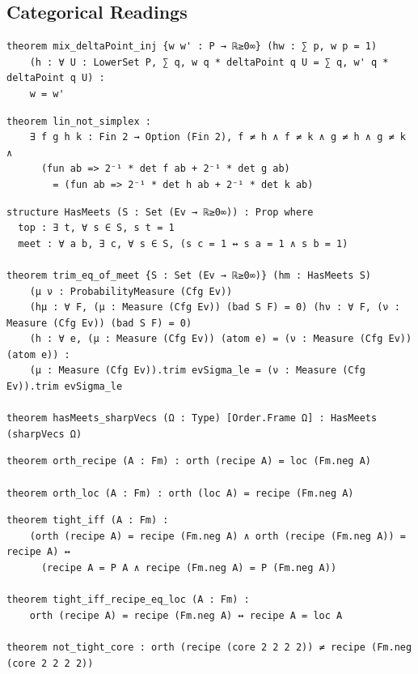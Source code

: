 \subsection{Categorical Readings}

\label{lean:mix-deltapoint-inj}
\begin{lstlisting}
theorem mix_deltaPoint_inj {w w' : P → ℝ≥0∞} (hw : ∑ p, w p = 1)
    (h : ∀ U : LowerSet P, ∑ q, w q * deltaPoint q U = ∑ q, w' q * deltaPoint q U) :
    w = w'
\end{lstlisting}

\label{lean:lin-not-simplex}
\begin{lstlisting}
theorem lin_not_simplex :
    ∃ f g h k : Fin 2 → Option (Fin 2), f ≠ h ∧ f ≠ k ∧ g ≠ h ∧ g ≠ k ∧
      (fun ab => 2⁻¹ * det f ab + 2⁻¹ * det g ab)
        = (fun ab => 2⁻¹ * det h ab + 2⁻¹ * det k ab)
\end{lstlisting}

\label{lean:rep-unique}
\begin{lstlisting}
structure HasMeets (S : Set (Ev → ℝ≥0∞)) : Prop where
  top : ∃ t, ∀ s ∈ S, s t = 1
  meet : ∀ a b, ∃ c, ∀ s ∈ S, (s c = 1 ↔ s a = 1 ∧ s b = 1)

theorem trim_eq_of_meet {S : Set (Ev → ℝ≥0∞)} (hm : HasMeets S)
    (μ ν : ProbabilityMeasure (Cfg Ev))
    (hμ : ∀ F, (μ : Measure (Cfg Ev)) (bad S F) = 0) (hν : ∀ F, (ν : Measure (Cfg Ev)) (bad S F) = 0)
    (h : ∀ e, (μ : Measure (Cfg Ev)) (atom e) = (ν : Measure (Cfg Ev)) (atom e)) :
    (μ : Measure (Cfg Ev)).trim evSigma_le = (ν : Measure (Cfg Ev)).trim evSigma_le

theorem hasMeets_sharpVecs (Ω : Type) [Order.Frame Ω] : HasMeets (sharpVecs Ω)
\end{lstlisting}

\label{lean:orth-recipe}
\begin{lstlisting}
theorem orth_recipe (A : Fm) : orth (recipe A) = loc (Fm.neg A)

theorem orth_loc (A : Fm) : orth (loc A) = recipe (Fm.neg A)
\end{lstlisting}

\label{lean:tight}
\begin{lstlisting}
theorem tight_iff (A : Fm) :
    (orth (recipe A) = recipe (Fm.neg A) ∧ orth (recipe (Fm.neg A)) = recipe A) ↔
      (recipe A = P A ∧ recipe (Fm.neg A) = P (Fm.neg A))

theorem tight_iff_recipe_eq_loc (A : Fm) :
    orth (recipe A) = recipe (Fm.neg A) ↔ recipe A = loc A

theorem not_tight_core : orth (recipe (core 2 2 2 2)) ≠ recipe (Fm.neg (core 2 2 2 2))
\end{lstlisting}

